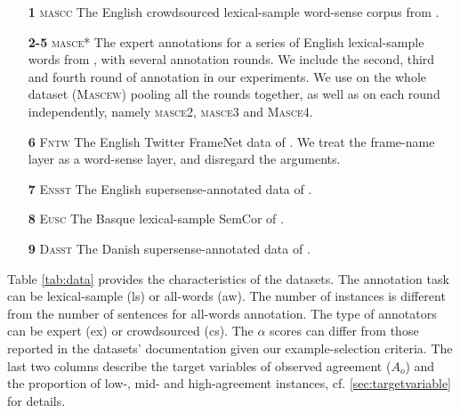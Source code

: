 \documentclass[11pt,a4paper]{article}
\begin{document}
\begin{itemize}[nolistsep,noitemsep]
\item[\textbf{1}] \textsc{mascc} The English crowdsourced lexical-sample word-sense corpus from .
\item[\textbf{2-5}] \textsc{masce*} The expert annotations for a series of English lexical-sample words from , with several annotation rounds. We include the second, third and fourth round of annotation in our experiments. We use on the whole dataset (\textsc{Mascew}) pooling all the rounds together, as well as on each round independently, namely \textsc{masce2}, \textsc{masce3} and \textsc{Masce4}.
\item[\textbf{6}] \textsc{Fntw} The English Twitter FrameNet data of . We treat the frame-name layer as a word-sense layer, and disregard the arguments.
\item[\textbf{7}] \textsc{Ensst} The English supersense-annotated data of .
\item[\textbf{8}] \textsc{Eusc} The Basque lexical-sample SemCor of .
\item[\textbf{9}] \textsc{Dasst} The Danish supersense-annotated  data of .
\end{itemize}
Table \ref{tab:data} provides the characteristics of the datasets. The annotation task can be lexical-sample (ls) or all-words (aw). The number of instances is different from the number of sentences for all-words annotation. The type of annotators can be expert (ex) or crowdsourced (cs). The $\alpha$ scores can differ from those reported in the datasets' documentation given our example-selection criteria. The last two columns describe the target variables of observed agreement ($A_o$) and the proportion of low-, mid- and high-agreement instances, cf. \ref{sec:targetvariable} for details.
\end{document}
